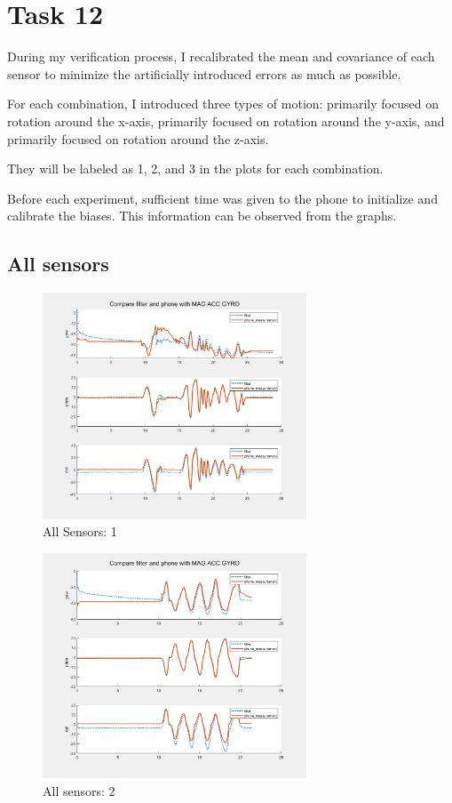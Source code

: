 \section{Task 12}

During my verification process, I recalibrated the mean and covariance of each sensor to minimize the artificially introduced errors as much as possible. 


For each combination, I introduced three types of motion: primarily focused on rotation around the x-axis, primarily focused on rotation around the y-axis, and primarily focused on rotation around the z-axis.

They will be labeled as 1, 2, and 3 in the plots for each combination.


Before each experiment, sufficient time was given to the phone to initialize and calibrate the biases. This information can be observed from the graphs.

\subsection{All sensors}

\begin{figure}[H]
 \centering
 \includegraphics[width=0.7\textwidth]{images/allsensors1.png}
 \caption{All Sensors: 1}
 \label{all1}
\end{figure}

\begin{figure}[H]
 \centering
 \includegraphics[width=0.7\textwidth]{images/allsensors2.png}
 \caption{All sensors: 2}
 \label{all2}
\end{figure}

